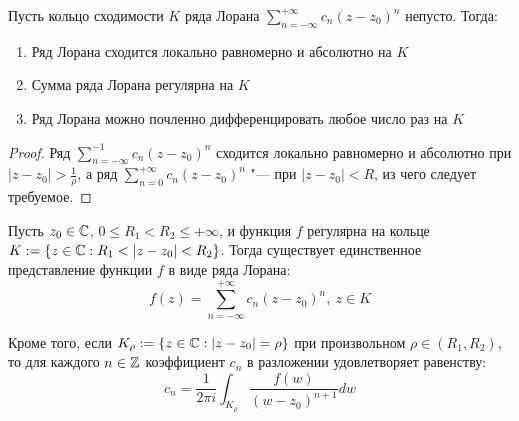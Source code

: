 \begin{proposition}
	Пусть кольцо сходимости $K$ ряда Лорана $\sum\limits_{n = -\infty}^{+\infty}c_n(z - z_0)^n$ непусто. Тогда:
	\begin{enumerate}
		\item Ряд Лорана сходится локально равномерно и абсолютно на $K$
		\item Сумма ряда Лорана регулярна на $K$
		\item Ряд Лорана можно почленно дифференцировать любое число раз на $K$
	\end{enumerate}
\end{proposition}

\begin{proof}
	Ряд $\sum\limits_{n = -\infty}^{-1}c_n(z - z_0)^n$ сходится локально равномерно и абсолютно при $|z - z_0| > \frac{1}\rho$, а ряд $\sum\limits_{n = 0}^{+\infty}c_n(z - z_0)^n$ "--- при $|z - z_0| < R$, из чего следует требуемое.
\end{proof}

\begin{theorem}
	Пусть $z_0 \in \mathbb{C}$, $0 \le R_1 < R_2 \le +\infty$, и функция $f$ регулярна на кольце $K := \{z \in \mathbb{C}: R_1 < |z - z_0| < R_2\}$. Тогда существует единственное представление функции $f$ в виде ряда Лорана:
	\[f(z) = \sum\limits_{n = -\infty}^{+\infty}c_n(z - z_0)^n,~z \in K\]
	
	Кроме того, если $K_\rho := \{z \in \mathbb{C}: |z - z_0| = \rho\}$ при произвольном $\rho \in (R_1, R_2)$, то для каждого $n \in \mathbb{Z}$ коэффициент $c_n$ в разложении удовлетворяет равенству:
	\[c_n = \frac1{2\pi i}\int_{K_{\rho}} \frac{f(w)}{(w - z_0)^{n+1}}dw\]
\end{theorem}

